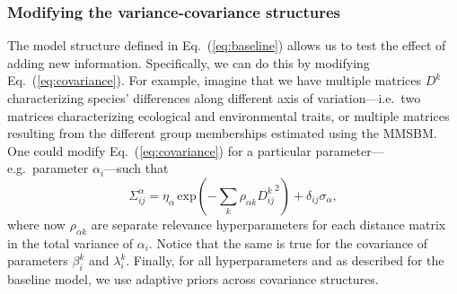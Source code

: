 \documentclass[11pt, a4paper]{article}
\begin{document}
\subsubsection*{Modifying the variance-covariance structures}
The model structure defined in Eq.~(\ref{eq:baseline}) allows us to test the effect of adding new information. Specifically, we can do this by modifying Eq.~(\ref{eq:covariance}). For example, imagine that we have multiple matrices $D^k$ characterizing species' differences along different axis of variation---i.e.~two matrices characterizing ecological and environmental traits, or multiple matrices resulting from the different group memberships estimated using the MMSBM. One could modify Eq.~(\ref{eq:covariance}) for a particular parameter---e.g.~parameter $\alpha_i$---such that
\begin{equation} 
\Sigma^{\alpha}_{ij} = \eta_{\alpha}\,\text{exp}\left(-\sum_k\rho_{\alpha k} {D^{k}_{ij}}^2\right) + \delta_{ij} \sigma_{\alpha} ,
\label{eq:covariance-complex}
\end{equation}
where now $\rho_{\alpha k}$ are separate relevance hyperparameters for each distance matrix in the total variance of $\alpha_i$. Notice that the same is true for the covariance of parameters $\beta_i^k$ and $\lambda_i^k$. Finally, for all hyperparameters and as described for the baseline model, we use adaptive priors across covariance structures.

\end{document}
